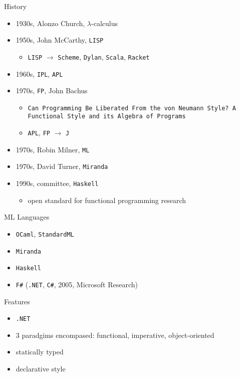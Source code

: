 \documentclass{beamer}
\begin{document}
\begin{frame}{History}
  \begin{itemize}[<+->]
    \item 1930s, Alonzo Church, $\lambda$-calculus
    \item 1950s, John McCarthy, \texttt{LISP}
    \begin{itemize}
      \item \texttt{LISP} $\rightarrow$ \texttt{Scheme}, \texttt{Dylan},
      \texttt{Scala}, \texttt{Racket}
    \end{itemize}
    \item 1960s, \texttt{IPL}, \texttt{APL}
    \item 1970s, \texttt{FP}, John Bachus
    \begin{itemize}
      \item \texttt{Can Programming Be Liberated From the von Neumann Style? A
      Functional Style and its Algebra of Programs}
      \item \texttt{APL}, \texttt{FP} $\rightarrow$ \texttt{J}
    \end{itemize}
    \item 1970s, Robin Milner, \texttt{ML}
    \item 1970s, David Turner, \texttt{Miranda}
    \item 1990s, committee, \texttt{Haskell}
    \begin{itemize}
      \item open standard for functional programming research
    \end{itemize}
  \end{itemize}
\end{frame}

\begin{frame}{ML Languages}
  \begin{itemize}
    \item \texttt{OCaml}, \texttt{StandardML}
    \item \texttt{Miranda}
    \item \texttt{Haskell}
    \pause
    \item \texttt{F\#} (\texttt{.NET}, \texttt{C\#}, 2005, Microsoft Research)
  \end{itemize}
\end{frame}

\begin{frame}{Features}
  \begin{itemize}
    \item \texttt{.NET}
    \item 3 paradgims encompased: functional, imperative, object-oriented
    \item statically typed
    \item declarative style
  \end{itemize}
\end{frame}
\end{document}
